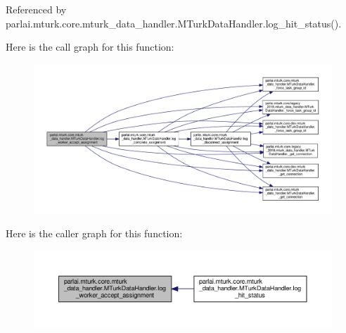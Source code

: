 Referenced by parlai.\+mturk.\+core.\+mturk\+\_\+data\+\_\+handler.\+M\+Turk\+Data\+Handler.\+log\+\_\+hit\+\_\+status().

Here is the call graph for this function\+:
\nopagebreak
\begin{figure}[H]
\begin{center}
\leavevmode
\includegraphics[width=350pt]{classparlai_1_1mturk_1_1core_1_1mturk__data__handler_1_1MTurkDataHandler_a080c2ffbf861cfe6175491a7a0bdd0ce_cgraph}
\end{center}
\end{figure}
Here is the caller graph for this function\+:
\nopagebreak
\begin{figure}[H]
\begin{center}
\leavevmode
\includegraphics[width=350pt]{classparlai_1_1mturk_1_1core_1_1mturk__data__handler_1_1MTurkDataHandler_a080c2ffbf861cfe6175491a7a0bdd0ce_icgraph}
\end{center}
\end{figure}
\mbox{\label{classparlai_1_1mturk_1_1core_1_1mturk__data__handler_1_1MTurkDataHandler_a1cd561165b5924033cc44eaf69c3425c}} 
